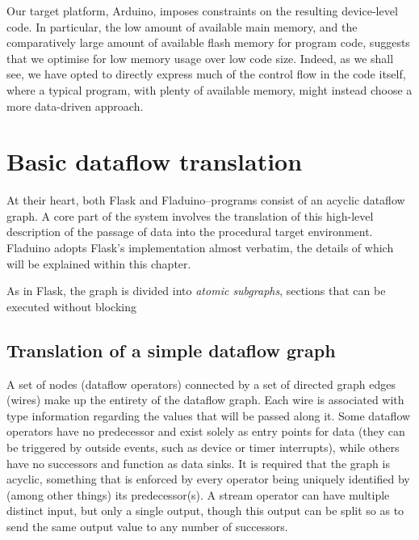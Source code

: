 \documentclass[a4paper, oneside, draft]{memoir}
\begin{document}
Our target platform, Arduino, imposes constraints on the resulting
device-level code.  In particular, the low amount of available main
memory, and the comparatively large amount of available flash memory
for program code, suggests that we optimise for low memory usage over
low code size.  Indeed, as we shall see, we have opted to directly
express much of the control flow in the code itself, where a typical
program, with plenty of available memory, might instead choose a more
data-driven approach.

\section{Basic dataflow translation}

At their heart, both Flask and Fladuino--programs consist of an
acyclic dataflow graph.  A core part of the system involves the
translation of this high-level description of the passage of data into
the procedural target environment.  Fladuino adopts Flask's
implementation almost verbatim, the details of which will be explained
within this chapter.

As in Flask, the graph is divided into \textit{atomic subgraphs},
sections that can be executed without blocking

\subsection{Translation of a simple dataflow graph}

A set of nodes (dataflow operators) connected by a set of directed
graph edges (wires) make up the entirety of the dataflow graph. Each
wire is associated with type information regarding the values that
will be passed along it.  Some dataflow operators have no predecessor
and exist solely as entry points for data (they can be triggered by
outside events, such as device or timer interrupts), while others have
no successors and function as data sinks.  It is required that the
graph is acyclic, something that is enforced by every operator being
uniquely identified by (among other things) its predecessor(s).  A
stream operator can have multiple distinct input, but only a single
output, though this output can be split so as to send the same output
value to any number of successors.
\end{document}
